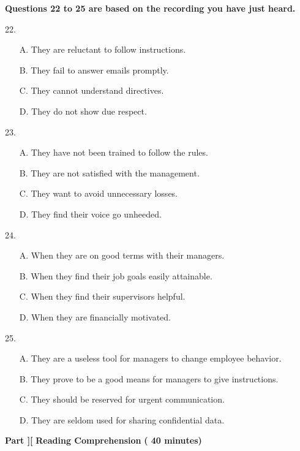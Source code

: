 \documentclass[UTF8,11pt]{ctexart}
\begin{document}
\textbf{Questions 22 to 25 are based on the recording you have just heard.}


22.


\begin{itemize}[leftmargin=2em,itemsep=.2em,topsep=.4em]\item[A.] They are reluctant to follow instructions.
\item[B.] They fail to answer emails promptly.
\item[C.] They cannot understand directives.
\item[D.] They do not show due respect.
\end{itemize}

23.


\begin{itemize}[leftmargin=2em,itemsep=.2em,topsep=.4em]\item[A.] They have not been trained to follow the rules.
\item[B.] They are not satisfied with the management.
\item[C.] They want to avoid unnecessary losses.
\item[D.] They find their voice go unheeded.
\end{itemize}

24.


\begin{itemize}[leftmargin=2em,itemsep=.2em,topsep=.4em]\item[A.] When they are on good terms with their managers.
\item[B.] When they find their job goals easily attainable.
\item[C.] When they find their supervisors helpful.
\item[D.] When they are financially motivated.
\end{itemize}

25.


\begin{itemize}[leftmargin=2em,itemsep=.2em,topsep=.4em]\item[A.] They are a useless tool for managers to change employee behavior.
\item[B.] They prove to be a good means for managers to give instructions.
\item[C.] They should be reserved for urgent communication.
\item[D.] They are seldom used for sharing confidential data.
\end{itemize}

\textbf{Part ][} \textbf{Reading Comprehension} \textbf{( 40 minutes)}
\end{document}
